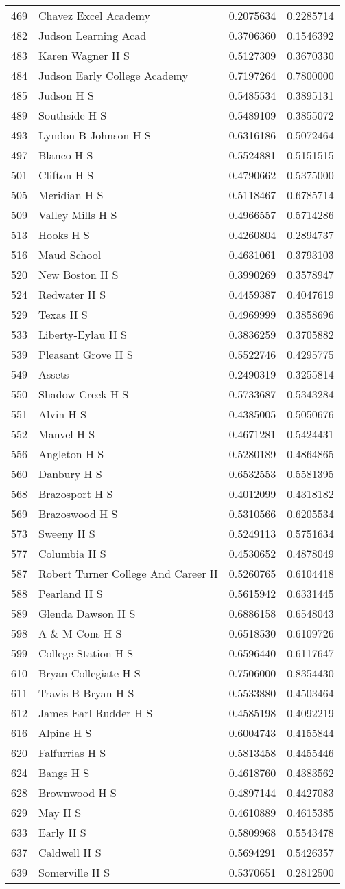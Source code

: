 \documentclass[
]{article}
\begin{document}
\begin{longtable}[]{@{}llrr@{}}
469 & Chavez Excel Academy & 0.2075634 & 0.2285714\tabularnewline
482 & Judson Learning Acad & 0.3706360 & 0.1546392\tabularnewline
483 & Karen Wagner H S & 0.5127309 & 0.3670330\tabularnewline
484 & Judson Early College Academy & 0.7197264 &
0.7800000\tabularnewline
485 & Judson H S & 0.5485534 & 0.3895131\tabularnewline
489 & Southside H S & 0.5489109 & 0.3855072\tabularnewline
493 & Lyndon B Johnson H S & 0.6316186 & 0.5072464\tabularnewline
497 & Blanco H S & 0.5524881 & 0.5151515\tabularnewline
501 & Clifton H S & 0.4790662 & 0.5375000\tabularnewline
505 & Meridian H S & 0.5118467 & 0.6785714\tabularnewline
509 & Valley Mills H S & 0.4966557 & 0.5714286\tabularnewline
513 & Hooks H S & 0.4260804 & 0.2894737\tabularnewline
516 & Maud School & 0.4631061 & 0.3793103\tabularnewline
520 & New Boston H S & 0.3990269 & 0.3578947\tabularnewline
524 & Redwater H S & 0.4459387 & 0.4047619\tabularnewline
529 & Texas H S & 0.4969999 & 0.3858696\tabularnewline
533 & Liberty-Eylau H S & 0.3836259 & 0.3705882\tabularnewline
539 & Pleasant Grove H S & 0.5522746 & 0.4295775\tabularnewline
549 & Assets & 0.2490319 & 0.3255814\tabularnewline
550 & Shadow Creek H S & 0.5733687 & 0.5343284\tabularnewline
551 & Alvin H S & 0.4385005 & 0.5050676\tabularnewline
552 & Manvel H S & 0.4671281 & 0.5424431\tabularnewline
556 & Angleton H S & 0.5280189 & 0.4864865\tabularnewline
560 & Danbury H S & 0.6532553 & 0.5581395\tabularnewline
568 & Brazosport H S & 0.4012099 & 0.4318182\tabularnewline
569 & Brazoswood H S & 0.5310566 & 0.6205534\tabularnewline
573 & Sweeny H S & 0.5249113 & 0.5751634\tabularnewline
577 & Columbia H S & 0.4530652 & 0.4878049\tabularnewline
587 & Robert Turner College And Career H & 0.5260765 &
0.6104418\tabularnewline
588 & Pearland H S & 0.5615942 & 0.6331445\tabularnewline
589 & Glenda Dawson H S & 0.6886158 & 0.6548043\tabularnewline
598 & A \& M Cons H S & 0.6518530 & 0.6109726\tabularnewline
599 & College Station H S & 0.6596440 & 0.6117647\tabularnewline
610 & Bryan Collegiate H S & 0.7506000 & 0.8354430\tabularnewline
611 & Travis B Bryan H S & 0.5533880 & 0.4503464\tabularnewline
612 & James Earl Rudder H S & 0.4585198 & 0.4092219\tabularnewline
616 & Alpine H S & 0.6004743 & 0.4155844\tabularnewline
620 & Falfurrias H S & 0.5813458 & 0.4455446\tabularnewline
624 & Bangs H S & 0.4618760 & 0.4383562\tabularnewline
628 & Brownwood H S & 0.4897144 & 0.4427083\tabularnewline
629 & May H S & 0.4610889 & 0.4615385\tabularnewline
633 & Early H S & 0.5809968 & 0.5543478\tabularnewline
637 & Caldwell H S & 0.5694291 & 0.5426357\tabularnewline
639 & Somerville H S & 0.5370651 & 0.2812500\tabularnewline

\end{longtable}
\end{document}
